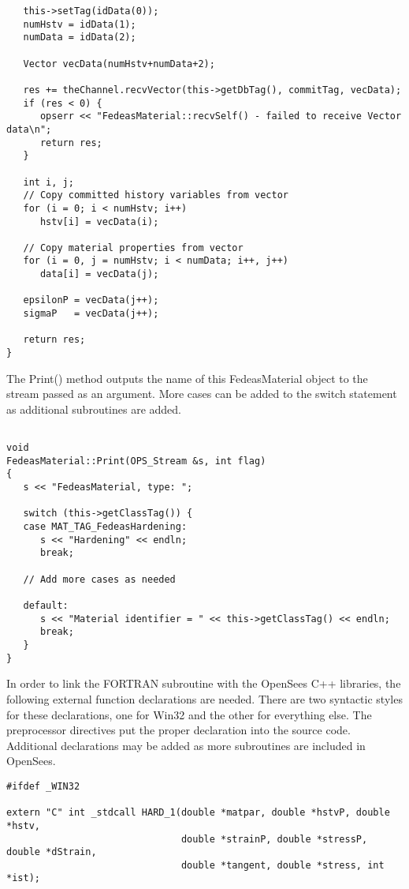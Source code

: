 \documentclass[12pt]{article}
\begin{document}
{{\begin{verbatim}
   this->setTag(idData(0));
   numHstv = idData(1);
   numData = idData(2);
     
   Vector vecData(numHstv+numData+2);
     
   res += theChannel.recvVector(this->getDbTag(), commitTag, vecData);
   if (res < 0) {
      opserr << "FedeasMaterial::recvSelf() - failed to receive Vector data\n";
      return res;
   }
     
   int i, j;
   // Copy committed history variables from vector
   for (i = 0; i < numHstv; i++)
      hstv[i] = vecData(i);
     
   // Copy material properties from vector
   for (i = 0, j = numHstv; i < numData; i++, j++)
      data[i] = vecData(j);
     
   epsilonP = vecData(j++);
   sigmaP   = vecData(j++);
     
   return res;
}
\end{verbatim}
}

\noindent The Print() method outputs the name of this FedeasMaterial object to
the stream passed as an argument. More cases can be added to
the switch statement as additional subroutines are added.
    
{\sf\small
\begin{verbatim}

void
FedeasMaterial::Print(OPS_Stream &s, int flag)
{
   s << "FedeasMaterial, type: ";
           
   switch (this->getClassTag()) {
   case MAT_TAG_FedeasHardening:
      s << "Hardening" << endln;
      break;

   // Add more cases as needed
       
   default:
      s << "Material identifier = " << this->getClassTag() << endln;
      break;
   }
}
\end{verbatim}
}

\noindent In order to link the FORTRAN subroutine with the OpenSees C++ libraries, the
following external function declarations are needed. There are two syntactic styles for
these declarations, one for Win32 and the other for everything else. The preprocessor directives
put the proper declaration into the source code. Additional declarations may be added
as more subroutines are included in OpenSees.

{\sf\small
\begin{verbatim}
#ifdef _WIN32

extern "C" int _stdcall HARD_1(double *matpar, double *hstvP, double *hstv,
                               double *strainP, double *stressP, double *dStrain,
                               double *tangent, double *stress, int *ist);


\end{verbatim}}}
\end{document}
